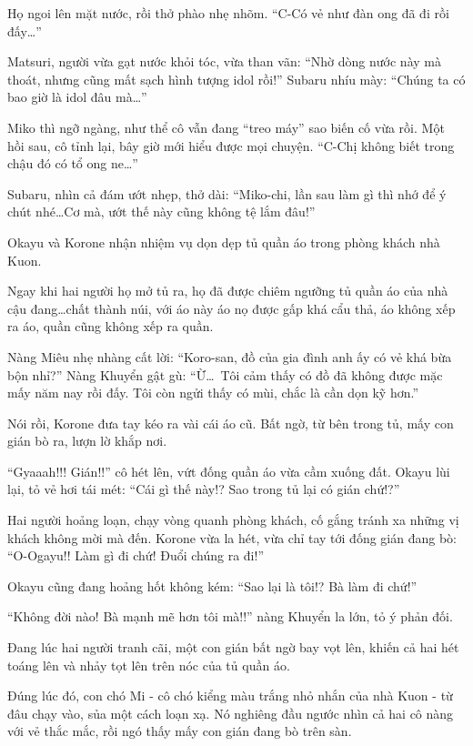 \documentclass[../main.tex]{subfiles}
\begin{document}
Họ ngoi lên mặt nước, rồi thở phào nhẹ nhõm. ``C-Có vẻ như đàn ong đã đi rồi đấy\dots''

Matsuri, người vừa gạt nước khỏi tóc, vừa than vãn: ``Nhờ dòng nước này mà thoát, nhưng cũng mất sạch hình tượng idol rồi!'' Subaru nhíu mày: ``Chúng ta có bao giờ là idol đâu mà\dots''

Miko thì ngỡ ngàng, như thể cô vẫn đang ``treo máy'' sao biến cố vừa rồi. Một hồi sau, cô tỉnh lại, bây giờ mới hiểu được mọi chuyện. ``C-Chị không biết trong chậu đó có tổ ong ne\dots''

Subaru, nhìn cả đám ướt nhẹp, thở dài: ``Miko-chi, lần sau làm gì thì nhớ để ý chút nhé\dots Cơ mà, ướt thế này cũng không tệ lắm đâu!''

\ct

Okayu và Korone nhận nhiệm vụ dọn dẹp tủ quần áo trong phòng khách nhà Kuon.

Ngay khi hai người họ mở tủ ra, họ đã được chiêm ngưỡng tủ quần áo của nhà cậu đang\dots chất thành núi, với áo này áo nọ được gấp khá cẩu thả, áo không xếp ra áo, quần cũng không xếp ra quần.

Nàng Miêu nhẹ nhàng cất lời: ``Koro-san, đồ của gia đình anh ấy có vẻ khá bừa bộn nhỉ?'' Nàng Khuyển gật gù: ``Ừ\dots\ Tôi cảm thấy có đồ đã không được mặc mấy năm nay rồi đấy. Tôi còn ngửi thấy có mùi, chắc là cần dọn kỹ hơn.''

Nói rồi, Korone đưa tay kéo ra vài cái áo cũ. Bất ngờ, từ bên trong tủ, mấy con gián bò ra, lượn lờ khắp nơi.

``Gyaaah!!! Gián!!'' cô hét lên, vứt đống quần áo vừa cầm xuống đất. Okayu lùi lại, tỏ vẻ hơi tái mét: ``Cái gì thế này!? Sao trong tủ lại có gián chứ!?''

Hai người hoảng loạn, chạy vòng quanh phòng khách, cố gắng tránh xa những vị khách không mời mà đến. Korone vừa la hét, vừa chỉ tay tới đống gián đang bò: ``O-Ogayu!! Làm gì đi chứ! Đuổi chúng ra đi!''

Okayu cũng đang hoảng hốt không kém: ``Sao lại là tôi!? Bà làm đi chứ!''

``Không đời nào! Bà mạnh mẽ hơn tôi mà!!'' nàng Khuyển la lớn, tỏ ý phản đối.

Đang lúc hai người tranh cãi, một con gián bất ngờ bay vọt lên, khiến cả hai hét toáng lên và nhảy tọt lên trên nóc của tủ quần áo.

Đúng lúc đó, con chó Mi - cô chó kiểng màu trắng nhỏ nhắn của nhà Kuon - từ đâu chạy vào, sủa một cách loạn xạ. Nó nghiêng đầu ngước nhìn cả hai cô nàng với vẻ thắc mắc, rồi ngó thấy mấy con gián đang bò trên sàn.
\end{document}
